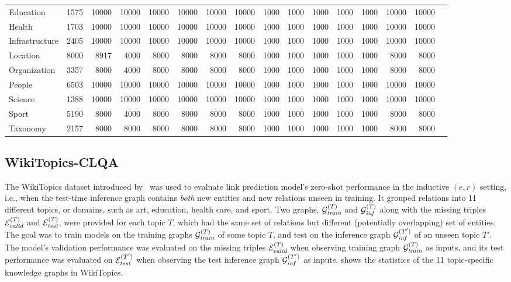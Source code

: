 \begin{table}[!ht]
\begin{adjustbox}{width=\textwidth}
\begin{tabular}{lrrrrrrrrrrrrrrr}
Education & 1575 & 10000 & 10000 & 10000 & 10000 & 10000 & 10000 & 1000 & 1000 & 1000 & 1000 & 1000 & 10000 & 10000 \\
Health & 1703 & 10000 & 10000 & 10000 & 10000 & 10000 & 10000 & 1000 & 1000 & 1000 & 1000 & 1000 & 10000 & 10000 \\
Infrastructure & 2405 & 10000 & 10000 & 10000 & 10000 & 10000 & 10000 & 1000 & 1000 & 1000 & 1000 & 1000 & 10000 & 10000 \\
Location & 8000 & 8917 & 4000 & 8000 & 8000 & 8000 & 8000 & 1000 & 1000 & 1000 & 1000 & 1000 & 8000 & 8000 \\
Organization & 3357 & 8000 & 4000 & 8000 & 8000 & 8000 & 8000 & 1000 & 1000 & 1000 & 1000 & 1000 & 8000 & 8000 \\
People & 6503 & 10000 & 10000 & 10000 & 10000 & 10000 & 10000 & 1000 & 1000 & 1000 & 1000 & 1000 & 10000 & 10000 \\
Science & 1388 & 10000 & 10000 & 10000 & 10000 & 10000 & 10000 & 1000 & 1000 & 1000 & 1000 & 1000 & 10000 & 10000 \\
Sport & 5190 & 8000 & 4000 & 8000 & 8000 & 8000 & 8000 & 1000 & 1000 & 1000 & 1000 & 1000 & 8000 & 8000 \\
Taxonomy & 2157 & 8000 & 8000 & 8000 & 8000 & 8000 & 8000 & 1000 & 1000 & 1000 & 1000 & 1000 & 8000 & 8000 \\
\bottomrule
\end{tabular}
\end{adjustbox}
\label{tab:wikitopics-clqa}
\end{table}

\subsection{WikiTopics-CLQA}
\label{app:subsec_wikitopcs_clqa}

The WikiTopics dataset introduced by~\citet{isdea} was used to evaluate link prediction model's zero-shot performance in the  inductive $(e,r)$ setting, i.e., when the test-time inference graph contains \textit{both} new entities and new relations unseen in training. It grouped relations into 11 different topics, or domains, such as art, education, health care, and sport. Two graphs, $\mathcal{G}_{\textit{train}}^{(T)}$ and $\mathcal{G}_{\textit{inf}}^{(T)}$ along with the missing triples $\mathcal{E}^{(T)}_{\textit{valid}}$ and $\mathcal{E}^{(T)}_{\textit{test}}$, were provided for each topic $T$, which had the same set of relations but different (potentially overlapping) set of entities. 
The goal was to train models on the training graphs $\mathcal{G}_{\textit{train}}^{(T)}$ of some topic $T$, and test on the inference graph $\mathcal{G}_{\textit{inf}}^{(T')}$ of an unseen topic $T'$. 
The model's validation performance was evaluated on the missing triples $\mathcal{E}^{(T)}_{\textit{valid}}$ when observing training graph $\mathcal{G}_{\textit{train}}^{(T)}$ as inputs, and its test performance was evaluated on $\mathcal{E}^{(T')}_{\textit{test}}$ when observing the test inference graph $\mathcal{G}_{\textit{inf}}^{(T')}$ as inputs.  shows the statistics of the 11 topic-specific knowledge graphs in WikiTopics.

